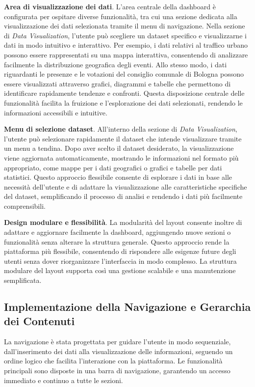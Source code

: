 \textbf{Area di visualizzazione dei dati}. L’area centrale della dashboard è configurata per ospitare diverse funzionalità, tra cui una sezione dedicata alla visualizzazione dei dati selezionata tramite il menu di navigazione. Nella sezione di \textit{Data Visualization}, l’utente può scegliere un dataset specifico e visualizzarne i dati in modo intuitivo e interattivo. Per esempio, i dati relativi al traffico urbano possono essere rappresentati su una mappa interattiva, consentendo di analizzare facilmente la distribuzione geografica degli eventi. Allo stesso modo, i dati riguardanti le presenze e le votazioni del consiglio comunale di Bologna possono essere visualizzati attraverso grafici, diagrammi e tabelle che permettono di identificare rapidamente tendenze e confronti. Questa disposizione centrale delle funzionalità facilita la fruizione e l’esplorazione dei dati selezionati, rendendo le informazioni accessibili e intuitive.

\textbf{Menu di selezione dataset}. All’interno della sezione di \textit{Data Visualization}, l’utente può selezionare rapidamente il dataset che intende visualizzare tramite un menu a tendina. Dopo aver scelto il dataset desiderato, la visualizzazione viene aggiornata automaticamente, mostrando le informazioni nel formato più appropriato, come mappe per i dati geografici o grafici e tabelle per dati statistici. Questo approccio flessibile consente di esplorare i dati in base alle necessità dell'utente e di adattare la visualizzazione alle caratteristiche specifiche del dataset, semplificando il processo di analisi e rendendo i dati più facilmente comprensibili.


\textbf{Design modulare e flessibilità}. La modularità del layout consente inoltre di adattare e aggiornare facilmente la dashboard, aggiungendo nuove sezioni o funzionalità senza alterare la struttura generale. Questo approccio rende la piattaforma più flessibile, consentendo di rispondere alle esigenze future degli utenti senza dover riorganizzare l'interfaccia in modo complesso. La struttura modulare del layout supporta così una gestione scalabile e una manutenzione semplificata.

\subsection{Implementazione della Navigazione e Gerarchia dei Contenuti}

La navigazione è stata progettata per guidare l’utente in modo sequenziale, dall’inserimento dei dati alla visualizzazione delle informazioni, seguendo un ordine logico che facilita l’interazione con la piattaforma. Le funzionalità principali sono disposte in una barra di navigazione, garantendo un accesso immediato e continuo a tutte le sezioni.

